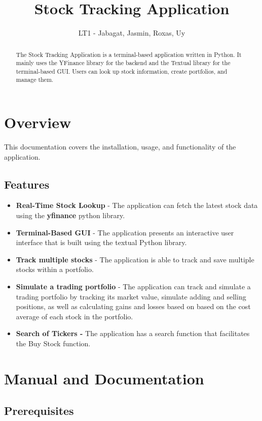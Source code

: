 \documentclass{article}
\title{Stock Tracking Application}
\author{LT1 - Jabagat, Jasmin, Roxas, Uy}
\begin{document}
\maketitle

\begin{abstract}
The Stock Tracking Application is a terminal-based application written in Python. It mainly uses the YFinance library for the backend and the Textual library for the terminal-based GUI. Users can look up stock information, create portfolios, and manage them. 
\end{abstract}

\section{Overview}

This documentation covers the installation, usage, and functionality of the application. 

\subsection{Features}

\begin{itemize}
    \item \textbf{Real-Time Stock Lookup} - The application can fetch the latest stock data using the \textbf{yfinance} python library. 
    \item \textbf{Terminal-Based GUI} - The application presents an interactive user interface that is built using the textual Python library. 
    \item \textbf{Track multiple stocks} - The application is able to track and save multiple stocks within a portfolio. 
    \item \textbf{Simulate a trading portfolio } - The application can track and simulate a trading portfolio by tracking its market value, simulate adding and selling positions, as well as calculating gains and losses based on based on the cost average of each stock in the portfolio.
    \item \textbf{Search of Tickers - }The application has a search function that facilitates the Buy Stock function.
\end{itemize}


\section{Manual and Documentation}

\subsection{Prerequisites}
\end{document}
